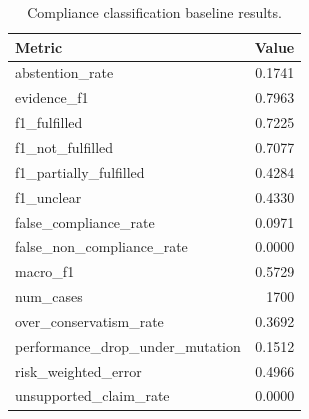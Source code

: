 \begin{table}[t]
\centering
\caption{Compliance classification baseline results.}
\begin{tabular}{lr}
\toprule
Metric & Value \\
\midrule
abstention\_rate & 0.1741 \\
evidence\_f1 & 0.7963 \\
f1\_fulfilled & 0.7225 \\
f1\_not\_fulfilled & 0.7077 \\
f1\_partially\_fulfilled & 0.4284 \\
f1\_unclear & 0.4330 \\
false\_compliance\_rate & 0.0971 \\
false\_non\_compliance\_rate & 0.0000 \\
macro\_f1 & 0.5729 \\
num\_cases & 1700 \\
over\_conservatism\_rate & 0.3692 \\
performance\_drop\_under\_mutation & 0.1512 \\
risk\_weighted\_error & 0.4966 \\
unsupported\_claim\_rate & 0.0000 \\
\bottomrule
\end{tabular}
\end{table}
